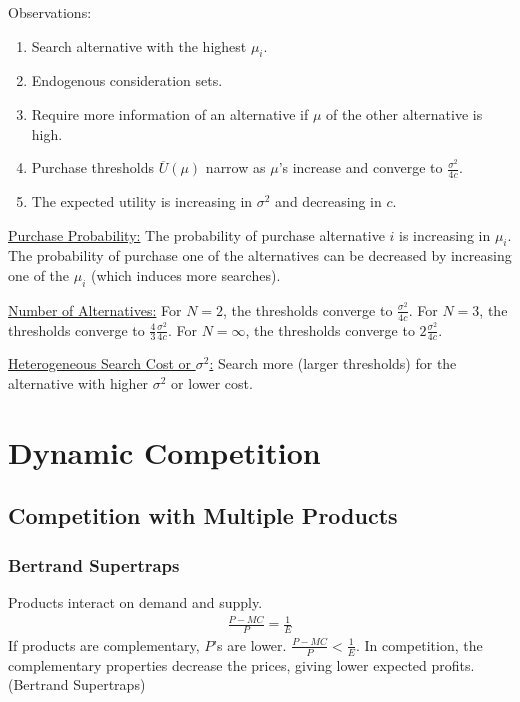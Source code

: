 \documentclass[11pt]{elegantbook}
\begin{document}
Observations:
\begin{enumerate}
    \item Search alternative with the highest $\mu_i$.
    \item Endogenous consideration sets.
    \item Require more information of an alternative if $\mu$ of the other alternative is high.
    \item Purchase thresholds $\overline{U}(\mu)$ narrow as $\mu$'s increase and converge to $\frac{\sigma^2}{4c}$.
    \item The expected utility is increasing in $\sigma^2$ and decreasing in $c$.
\end{enumerate}
\underline{Purchase Probability:} The probability of purchase alternative $i$ is increasing in $\mu_i$. The probability of purchase one of the alternatives can be decreased by increasing one of the $\mu_i$ (which induces more searches).

\underline{Number of Alternatives:} For $N=2$, the thresholds converge to $\frac{\sigma^2}{4c}$. For $N=3$, the thresholds converge to $\frac{4}{3}\frac{\sigma^2}{4c}$. For $N=\infty$, the thresholds converge to $2\frac{\sigma^2}{4c}$.

\underline{Heterogeneous Search Cost or $\sigma^2$:} Search more (larger thresholds) for the alternative with higher $\sigma^2$ or lower cost.



























\chapter{Dynamic Competition}
\section{Competition with Multiple Products}
\subsection{Bertrand Supertraps}
Products interact on demand and supply.
\begin{equation}
    \begin{aligned}
        \frac{P-MC}{P}=\frac{1}{E}
    \end{aligned}
    \nonumber
\end{equation}
If products are complementary, $P$'s are lower. $\frac{P-MC}{P}<\frac{1}{E}$. In competition, the complementary properties decrease the prices, giving lower expected profits. (Bertrand Supertraps)
\end{document}
